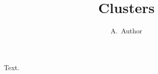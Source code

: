 \documentclass{myaipproc}
\begin{document}
\title{Clusters}
\author{A.~Author}
\maketitle
Text.
\end{document}
